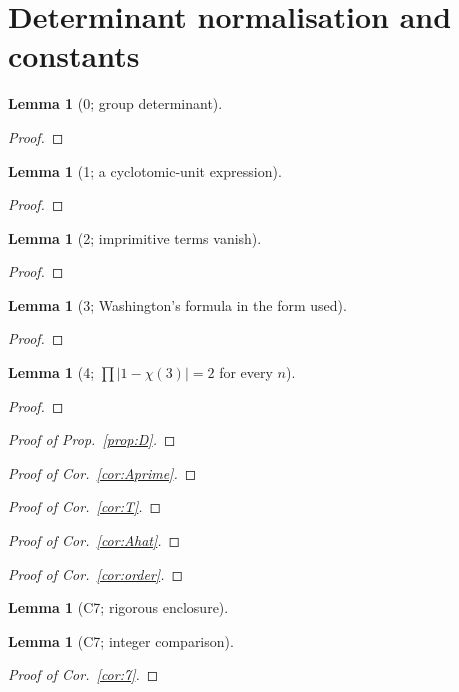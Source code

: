 \documentclass[11pt]{amsart}
\newtheorem{lemma}[theorem]{Lemma}
\theoremstyle{remark}\newtheorem{remark}[theorem]{Remark}
\theoremstyle{definition}\newtheorem{definition}[theorem]{Definition}
\theoremstyle{definition}\newtheorem{algorithm}[theorem]{Algorithm}
\providecommand{\proofsdir}{../../proofs} %
\begin{document}
\section{Determinant normalisation and constants}\label{app:D}
\begin{lemma}[0; group determinant]\label{lem:D0}

\end{lemma}
\begin{proof}

\end{proof}
\begin{lemma}[1; a cyclotomic-unit expression]\label{lem:D1}

\end{lemma}
\begin{proof}

\end{proof}
\begin{lemma}[2; imprimitive terms vanish]\label{lem:D2}

\end{lemma}
\begin{proof}

\end{proof}
\begin{lemma}[3; Washington's formula in the form used]\label{lem:D3}

\end{lemma}
\begin{proof}

\end{proof}
\begin{lemma}[4; $\prod|1-\chi(3)|=2$ for every $n$]\label{lem:prod13}

\end{lemma}
\begin{proof}

\end{proof}
\begin{proof}[Proof of Prop.~\ref{prop:D}]

\end{proof}
\begin{proof}[Proof of Cor.~\ref{cor:Aprime}]

\end{proof}
\begin{proof}[Proof of Cor.~\ref{cor:T}]

\end{proof}
\begin{proof}[Proof of Cor.~\ref{cor:Ahat}]

\end{proof}
\begin{proof}[Proof of Cor.~\ref{cor:order}]

\end{proof}
\begin{lemma}[C7; rigorous enclosure]\label{lem:C7}

\end{lemma}
\begin{lemma}[C7; integer comparison]\label{lem:C7int}

\end{lemma}
\par{}\par
\begin{proof}[Proof of Cor.~\ref{cor:7}]

\end{proof}
\end{document}
